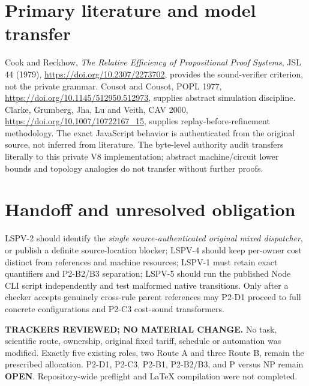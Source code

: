 \documentclass[11pt]{article}
\begin{document}
\section*{Primary literature and model transfer}
Cook and Reckhow, \emph{The Relative Efficiency of Propositional Proof Systems}, JSL 44 (1979), \url{https://doi.org/10.2307/2273702}, provides the sound-verifier criterion, not the private grammar. Cousot and Cousot, POPL 1977, \url{https://doi.org/10.1145/512950.512973}, supplies abstract simulation discipline. Clarke, Grumberg, Jha, Lu and Veith, CAV 2000, \url{https://doi.org/10.1007/10722167_15}, supplies replay-before-refinement methodology. The exact JavaScript behavior is authenticated from the original source, not inferred from literature. The byte-level authority audit transfers literally to this private V8 implementation; abstract machine/circuit lower bounds and topology analogies do not transfer without further proofs.

\section*{Handoff and unresolved obligation}
LSPV-2 should identify the \emph{single source-authenticated original mixed dispatcher}, or publish a definite source-location blocker; LSPV-4 should keep per-owner cost distinct from references and machine resources; LSPV-1 must retain exact quantifiers and P2-B2/B3 separation; LSPV-5 should run the published Node CLI script independently and test malformed native transitions. Only after a checker accepts genuinely cross-rule parent references may P2-D1 proceed to full concrete configurations and P2-C3 cost-sound transformers.

\noindent\textbf{TRACKERS REVIEWED; NO MATERIAL CHANGE.}
No task, scientific route, ownership, original fixed tariff, schedule or automation was modified. Exactly five existing roles, two Route A and three Route B, remain the prescribed allocation. P2-D1, P2-C3, P2-B1, P2-B2/B3, and P versus NP remain \textbf{OPEN}. Repository-wide preflight and LaTeX compilation were not completed.
\end{document}

